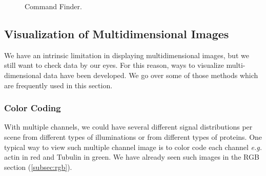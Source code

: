 \begin{figure}[htbp]
\centering
{}
\quad
{} 
\caption{Command Finder.}
\label{fig:commandfinder}
\end{figure}


\subsection{Visualization of Multidimensional Images}

We have an intrinsic limitation in displaying multidimensional images, but we still want to check data by our eyes. For this reason, ways to visualize multi-dimensional data have been developed. We go over some of those methods which are frequently used in this section. 

\subsubsection{Color Coding}

With multiple channels, we could have several different signal distributions per scene from different types of illuminations or from different types of proteins. One typical way to view such multiple channel image is to color code each channel \textit{e.g.} actin in red and Tubulin in green. We have already seen such images in the RGB section (\ref{subsec:rgb}). 

